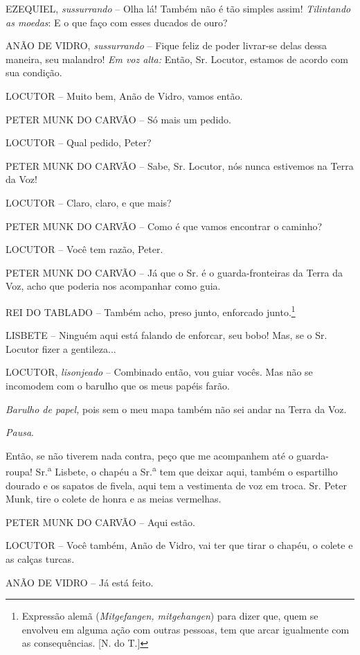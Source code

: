 EZEQUIEL, \emph{sussurrando} -- Olha lá! Também não é tão simples assim!
\emph{Tilintando as moedas}: E o que faço com esses ducados de ouro?

ANÃO DE VIDRO, \emph{sussurrando} -- Fique feliz de poder livrar-se
delas dessa maneira, seu malandro! \emph{Em voz alta:} Então, Sr.
Locutor, estamos de acordo com sua condição.

LOCUTOR -- Muito bem, Anão de Vidro, vamos então.

PETER MUNK DO CARVÃO -- Só mais um pedido.

LOCUTOR -- Qual pedido, Peter?

PETER MUNK DO CARVÃO -- Sabe, Sr. Locutor, nós nunca estivemos na Terra
da Voz!

LOCUTOR -- Claro, claro, e que mais?

PETER MUNK DO CARVÃO -- Como é que vamos encontrar o caminho?

LOCUTOR -- Você tem razão, Peter.

PETER MUNK DO CARVÃO -- Já que o Sr. é o guarda-fronteiras da Terra da
Voz, acho que poderia nos acompanhar como guia.

REI DO TABLADO -- Também acho, preso junto, enforcado junto.\footnote{Expressão
  alemã (\emph{Mitgefangen, mitgehangen}) para dizer que, quem se
  envolveu em alguma ação com outras pessoas, tem que arcar igualmente
  com as consequências. {[}N. do T.{]}}

LISBETE -- Ninguém aqui está falando de enforcar, seu bobo! Mas, se o
Sr. Locutor fizer a gentileza...

LOCUTOR, \emph{lisonjeado} -- Combinado então, vou guiar vocês. Mas não
se incomodem com o barulho que os meus papéis farão.

\emph{Barulho de papel,} pois sem o meu mapa também não sei andar na
Terra da Voz.

\emph{Pausa}.

Então, se não tiverem nada contra, peço que me acompanhem até o
guarda-roupa! Sr.\textsuperscript{a} Lisbete, o chapéu a
Sr.\textsuperscript{a} tem que deixar aqui, também o espartilho dourado
e os sapatos de fivela, aqui tem a vestimenta de voz em troca. Sr. Peter
Munk, tire o colete de honra e as meias vermelhas.

PETER MUNK DO CARVÃO -- Aqui estão.

LOCUTOR -- Você também, Anão de Vidro, vai ter que tirar o chapéu, o
colete e as calças turcas.

ANÃO DE VIDRO -- Já está feito.

